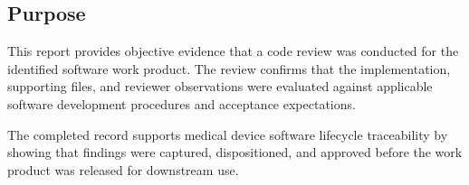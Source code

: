 \subsection{Purpose}
This report provides objective evidence that a code review was conducted for the
identified software work product.  The review confirms that the implementation,
supporting files, and reviewer observations were evaluated against applicable
software development procedures and acceptance expectations.

\tlcVspace

The completed record supports medical device software lifecycle traceability by
showing that findings were captured, dispositioned, and approved before the work
product was released for downstream use.
